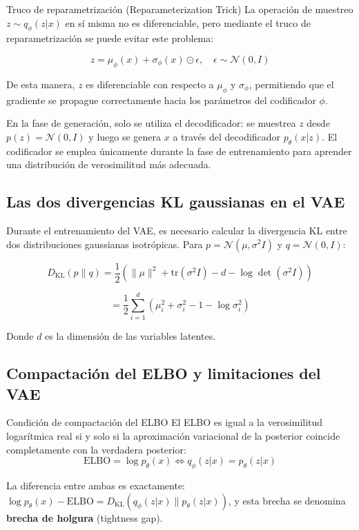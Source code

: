 \documentclass[a4paper]{article}
\begin{document}
\begin{knowledgebox}{Truco de reparametrización (Reparameterization Trick)}
La operación de muestreo $z \sim q_\phi(z|x)$ en sí misma no es diferenciable, pero mediante el truco de reparametrización se puede evitar este problema:

$$z = \mu_\phi(x) + \sigma_\phi(x) \odot \epsilon, \quad \epsilon \sim \mathcal{N}(0, I)$$

De esta manera, $z$ es diferenciable con respecto a $\mu_\phi$ y $\sigma_\phi$, permitiendo que el gradiente se propague correctamente hacia los parámetros del codificador $\phi$.
\end{knowledgebox}

En la fase de generación, solo se utiliza el decodificador: se muestrea $z$ desde $p(z) = \mathcal{N}(0, I)$ y luego se genera $x$ a través del decodificador $p_\theta(x|z)$. El codificador se emplea únicamente durante la fase de entrenamiento para aprender una distribución de verosimilitud más adecuada.

\subsection{Las dos divergencias KL gaussianas en el VAE}

Durante el entrenamiento del VAE, es necesario calcular la divergencia KL entre dos distribuciones gaussianas isotrópicas. Para $p = \mathcal{N}(\mu, \sigma^2 I)$ y $q = \mathcal{N}(0, I)$:

$$D_{\text{KL}}(p \| q) = \frac{1}{2} \left( \|\mu\|^2 + \text{tr}(\sigma^2 I) - d - \log \det(\sigma^2 I) \right)$$

$$= \frac{1}{2} \sum_{i=1}^{d} \left( \mu_i^2 + \sigma_i^2 - 1 - \log \sigma_i^2 \right)$$

Donde $d$ es la dimensión de las variables latentes.

\subsection{Compactación del ELBO y limitaciones del VAE}

\begin{importantbox}{Condición de compactación del ELBO}
El ELBO es igual a la verosimilitud logarítmica real si y solo si la aproximación variacional de la posterior coincide completamente con la verdadera posterior:
$$\text{ELBO} = \log p_\theta(x) \iff q_\phi(z|x) = p_\theta(z|x)$$

La diferencia entre ambas es exactamente: $\log p_\theta(x) - \text{ELBO} = D_{\text{KL}}(q_\phi(z|x) \| p_\theta(z|x))$, y esta brecha se denomina \textbf{brecha de holgura} (tightness gap).
\end{importantbox}
\end{document}
